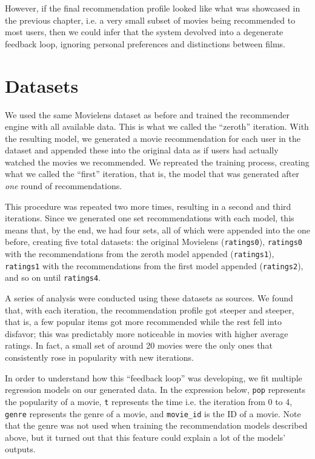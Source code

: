 However, if the final recommendation profile looked like what was showcased in
the previous chapter, i.e. a very small subset of movies being recommended to
most users, then we could infer that the system devolved into a degenerate
feedback loop, ignoring personal preferences and distinctions between films.

\section{Datasets}
\label{sec:datasets04}

We used the same Movielens dataset as before and trained the recommender engine
with all available data. This is what we called the ``zeroth'' iteration. With the
resulting model, we generated a movie recommendation for each user in the
dataset and appended these into the original data as if users had actually
watched the movies we recommended. We repreated the training process, creating
what we called the ``first'' iteration, that is, the model that was generated
after \emph{one} round of recommendations.

This procedure was repeated two more times, resulting in a second and third
iterations. Since we generated one set recommendations with each model, this
means that, by the end, we had four sets, all of which were appended into the
one before, creating five total datasets: the original Movielens
(\verb|ratings0|), \verb|ratings0| with the recommendations from the zeroth
model appended (\verb|ratings1|), \verb|ratings1| with the recommendations from
the first model appended (\verb|ratings2|), and so on until \verb|ratings4|.

A series of analysis were conducted using these datasets as sources. We found
that, with each iteration, the recommendation profile got steeper and steeper,
that is, a few popular items got more recommended while the rest fell into
disfavor; this was predictably more noticeable in movies with higher average
ratings. In fact, a small set of around 20 movies were the only ones that
consistently rose in popularity with new iterations.

In order to understand how this ``feedback loop'' was developing, we fit
multiple regression models on our generated data. In the expression below,
\verb|pop| represents the popularity of a movie, \verb|t| represents the time
i.e. the iteration from 0 to 4, \verb|genre| represents the genre of a movie,
and \verb|movie_id| is the ID of a movie. Note that the genre was not used when
training the recommendation models described above, but it turned out that this
feature could explain a lot of the models' outputs.

